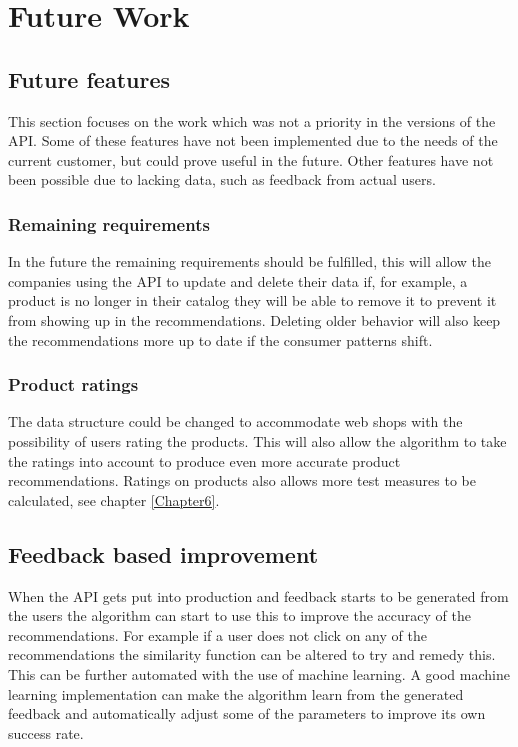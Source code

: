 
\chapter{Future Work} %

\label{Chapter9} %


\section{Future features}
This section focuses on the work which was not a priority in the versions of the API. Some of these features have not been implemented due to the needs of the current customer, but could prove useful in the future. Other features have not been possible due to lacking data, such as feedback from actual users.

\subsection{Remaining requirements}
In the future the remaining requirements should be fulfilled, this will allow the companies using the API to update and delete their data if, for example, a  product is no longer in their catalog they will be able to remove it to prevent it from showing up in the recommendations. Deleting older behavior will also keep the recommendations more up to date if the consumer patterns shift.

\subsection{Product ratings}
The data structure could be changed to accommodate web shops with the possibility of users rating the products. This will also allow the algorithm to take the ratings into account to produce even more accurate product recommendations. Ratings on products also allows more test measures to be calculated, see chapter \ref{Chapter6}.

\section{Feedback based improvement}
When the API gets put into production and feedback starts to be generated from the users the algorithm can start to use this to improve the accuracy of the recommendations. For example if a user does not click on any of the recommendations the similarity function can be altered to try and remedy this. This can be further automated with the use of machine learning. A good machine learning implementation can make the algorithm learn from the generated feedback and automatically adjust some of the parameters to improve its own success rate.

